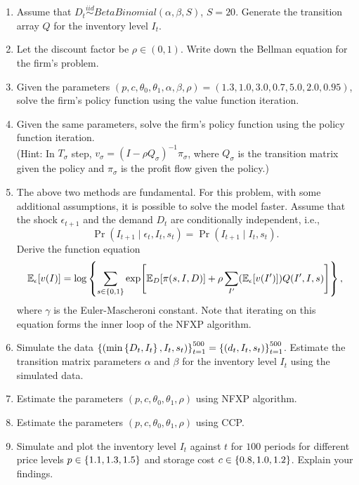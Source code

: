 \documentclass[12pt]{article}
\begin{document}
\begin{enumerate}
    \item Assume that $D_t\overset{iid}{\sim}BetaBinomial(\alpha, \beta, S)$, $S=20$.
    Generate the transition array $Q$ for the inventory level $I_t$.
    \item Let the discount factor be $\rho\in (0,1)$. Write down the Bellman equation 
    for the firm's problem. 
    \item Given the parameters $(p,c,\theta_0,\theta_1,\alpha,\beta,\rho) = (1.3, 1.0, 3.0, 0.7,5.0,2.0,0.95)$,
    solve the firm's policy function using the value function 
    iteration. 
    \item Given the same parameters, solve the firm's policy function using the policy function 
    iteration. \\
    (Hint: In $T_\sigma$ step, $v_\sigma = (I-\rho Q_\sigma)^{-1}\pi_\sigma$, where $Q_\sigma$ is the transition matrix 
    given the policy and $\pi_\sigma$ is the profit flow given the policy.)
    \item The above two methods are fundamental. For this problem, with some additional assumptions, 
    it is possible to solve the model faster. Assume that the shock $\epsilon_{t+1}$ and the demand $D_t$ are 
    conditionally independent, i.e., 
    \begin{equation*}
        \Pr(I_{t+1}\mid \epsilon_t, I_t, s_t) = \Pr(I_{t+1}\mid I_t, s_t).
    \end{equation*}  
    Derive the function equation
    \begin{equation*}
        \E_\epsilon\sbrc{v(I)} = \log\brc{\sum_{s\in\set{0,1}}\exp\sbrc{\E_D\sbrc{\pi(s,I,D)} + \rho\sum_{I'}(\E_\epsilon\sbrc{v(I')})Q(I', I, s)}},
    \end{equation*}
    where $\gamma$ is the Euler-Mascheroni constant. Note that iterating on this equation forms the inner loop of the NFXP algorithm.
    \item Simulate the data $\left\{ {(\min\left\{ {D_t, I_t} \right\}, I_t, s_t)} \right\}_{t=1}^{500} = \left\{ {(d_t, I_t, s_t)} \right\}_{t=1}^{500}$. 
    Estimate the transition matrix parameters $\alpha$ and $\beta$ for the inventory level $I_t$ 
    using the simulated data.  
    \item Estimate the parameters $(p,c,\theta_0,\theta_1,\rho)$ using NFXP algorithm. 
    \item Estimate the parameters $(p,c,\theta_0,\theta_1,\rho)$ using CCP.
    \item Simulate and plot the inventory level $I_t$ against $t$ for $100$ periods for 
    different price levels $p\in\left\{ {1.1, 1.3, 1.5} \right\}$ and storage cost $c\in\left\{ {0.8, 1.0, 1.2} \right\}$. 
    Explain your findings.
\end{enumerate}
\end{document}

